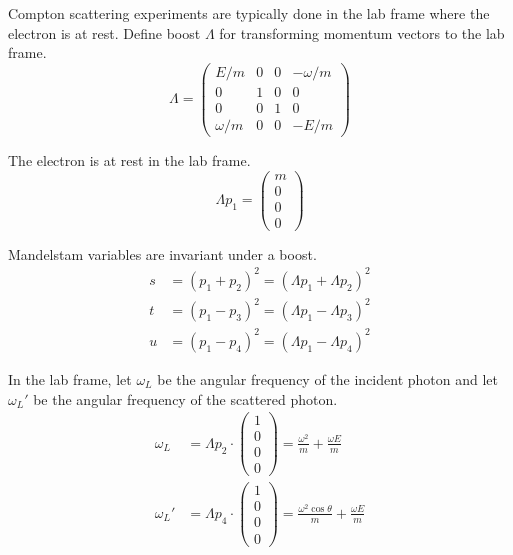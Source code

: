 Compton scattering experiments are typically done in the lab frame where the electron is at rest.
Define boost $\Lambda$ for transforming momentum vectors to the lab frame.
\begin{equation*}
\Lambda=
\begin{pmatrix}
E/m & 0 & 0 & -\omega/m\\
0 & 1 & 0 & 0\\
0 & 0 & 1 & 0\\
\omega/m & 0 & 0 & -E/m
\end{pmatrix}
\end{equation*}

The electron is at rest in the lab frame.
\begin{equation*}
\Lambda p_1=\begin{pmatrix}m\\0\\0\\0\end{pmatrix}
\end{equation*}

Mandelstam variables are invariant under a boost.
\begin{equation*}
\begin{aligned}
s&=(p_1+p_2)^2=(\Lambda p_1+\Lambda p_2)^2
\\
t&=(p_1-p_3)^2=(\Lambda p_1-\Lambda p_3)^2
\\
u&=(p_1-p_4)^2=(\Lambda p_1-\Lambda p_4)^2
\end{aligned}
\end{equation*}

In the lab frame, let $\omega_L$ be the angular frequency of the incident photon
and let $\omega_L'$ be the angular frequency of the scattered photon.
\begin{equation*}
\begin{aligned}
\omega_L&=\Lambda p_2\cdot\begin{pmatrix}1\\0\\0\\0\end{pmatrix}
=\frac{\omega^2}{m}+\frac{\omega E}{m}
\\[1ex]
\omega_L'&=\Lambda p_4\cdot\begin{pmatrix}1\\0\\0\\0\end{pmatrix}
=\frac{\omega^2\cos\theta}{m}+\frac{\omega E}{m}
\end{aligned}
\end{equation*}

